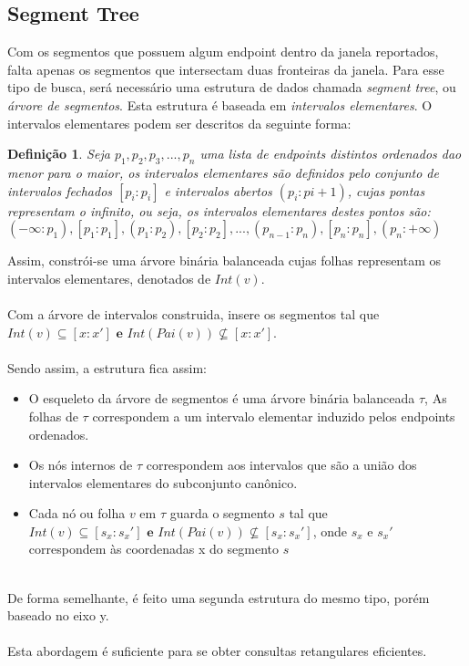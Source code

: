 \documentclass{article}
\newtheorem{definicao}{Definição}
\theoremstyle{definition}
\begin{document}
\subsection{Segment Tree}
\hspace*{15pt} Com os segmentos que possuem algum endpoint dentro da janela reportados,
falta apenas os segmentos que intersectam duas fronteiras da janela. Para esse tipo
de busca, será necessário uma estrutura de dados chamada \textit{segment tree}, ou
\textit{árvore de segmentos}. Esta estrutura é baseada em \textit{intervalos elementares}.
O intervalos elementares podem ser descritos da seguinte forma:\\
\begin{definicao}
    Seja $p_1, p_2, p_3, ..., p_n$ uma lista de endpoints distintos ordenados dao menor
    para o maior, os intervalos elementares são definidos pelo conjunto de intervalos
    fechados $[p_i:p_i]$ e intervalos abertos $(p_i:p{i+1})$, cujas pontas representam
    o infinito, ou seja, os intervalos elementares destes pontos são:\\
    $(-\infty: p_1), [p_1:p_1], (p_1:p_2), [p_2:p_2], ..., (p_{n-1}:p_n), [p_n:p_n], (p_n:+\infty)$
\end{definicao}
\hspace*{15pt} Assim, constrói-se uma árvore binária balanceada cujas folhas representam
os intervalos elementares, denotados de $Int(v)$. \\
\\
\hspace*{15pt} Com a árvore de intervalos construida, insere os segmentos tal que\\
\mbox{$Int(v) \subseteq [x:x'] \textbf{ e } Int(Pai(v)) \not\subseteq [x:x']$}.\\
\\
\hspace*{15pt} Sendo assim, a estrutura fica assim:
\begin{itemize}
    \item O esqueleto da árvore de segmentos é uma árvore binária balanceada $\tau$,
        As folhas de $\tau$ correspondem a um intervalo elementar induzido pelos
        endpoints ordenados.
    \item Os nós internos de $\tau$ correspondem aos intervalos que são a união dos
        intervalos elementares do subconjunto canônico.
    \item Cada nó ou folha $v$ em $\tau$ guarda o segmento $s$ tal que \\
        \mbox{$Int(v) \subseteq [s_x:s_x'] \textbf{ e } Int(Pai(v)) \not\subseteq [s_x:s_x']$},
        onde $s_x$ e $s_x'$ correspondem às coordenadas x do segmento $s$
\end{itemize}
\\
De forma semelhante, é feito uma segunda estrutura do mesmo tipo, porém baseado no eixo y.\\
\\
\hspace*{15pt} Esta abordagem é suficiente para se obter consultas retangulares eficientes.
\\ 
\end{document}
